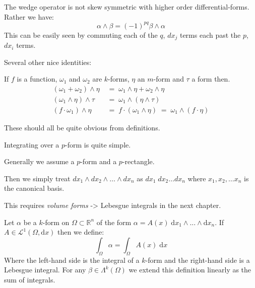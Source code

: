 The wedge operator is not skew symmetric with higher order differential-forms.
Rather we have:
\begin{equation}
	\alpha \wedge \beta = (-1)^{pq} \beta \wedge \alpha
\end{equation}
This can be easily seen by commuting each of the $q$, $dx_{j}$ terms each past the $p$, $dx_{i}$ terms.


Several other nice identities:

If $f$ is a function, $\omega_1$ and $\omega_2$ are $k$-forms, $\eta$ an $m$-form and $\tau$ a form then.
\begin{align}
	(\omega_1 + \omega_2) \wedge \eta  & \;=\; \omega_1 \wedge \eta + \omega_2 \wedge \eta \\
	(\omega_1 \wedge \eta) \wedge \tau & \;=\; \omega_1 \wedge ( \eta \wedge \tau ) \\
	(f \cdot \omega_1) \wedge \eta & \;=\;  f \cdot (\omega_1 \wedge \eta) \;=\; \omega_1 \wedge (f \cdot \eta)
\end{align}


These should all be quite obvious from definitions. 

Integrating over a $p$-form is quite simple.

Generally we assume a $p$-form and a $p$-rectangle.

Then we simply treat $dx_1 \wedge dx_2 \wedge \ldots \wedge dx_n$ as $dx_1 \;dx_2 \ldots dx_n$
where $x_1, x_2, \ldots x_n$ is the canonical basis.

This requires \emph{volume forms} -> Lebesgue integrals in the next chapter.

\begin{definition}
Let $\alpha$ be a $k$-form on $\Omega \subset \mathbb{R}^n$ of the form $\alpha = A(x) \; \text{d}x_1 \wedge ... \wedge \text{d} x_n$.
If $A \in \mathcal{L}^1 (\Omega , \text{d}x)$ then we define:
\begin{equation}
\int_\Omega \alpha = \int_\Omega A(x) \; \text{d}x
\end{equation}
Where the left-hand side is the integral of a $k$-form and the right-hand side is a Lebesgue integral.
For any $\beta \in \Lambda^k (\Omega)$ we extend this definition linearly as the sum of integrals.
\end{definition}



%
%

